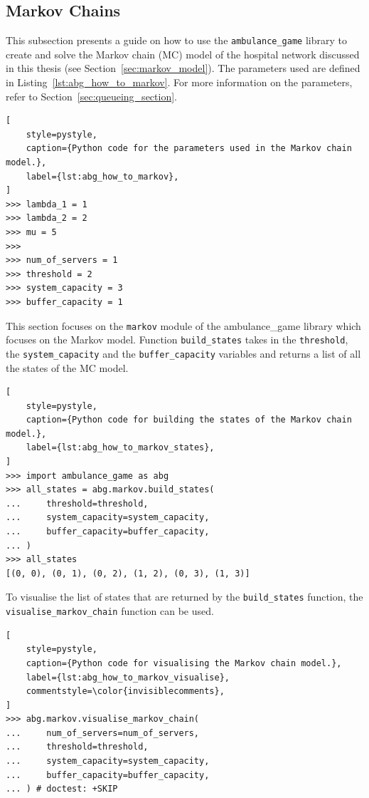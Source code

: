 \subsection{Markov Chains}

This subsection presents a guide on how to use the \texttt{ambulance\_game}
library to create and solve the Markov chain (MC) model of the hospital network
discussed in this thesis (see Section~\ref{sec:markov_model}).
The parameters used are defined in Listing~\ref{lst:abg_how_to_markov}.
For more information on the parameters, refer to
Section~\ref{sec:queueing_section}.


\begin{lstlisting}[
    style=pystyle,
    caption={Python code for the parameters used in the Markov chain model.},
    label={lst:abg_how_to_markov},
]
>>> lambda_1 = 1
>>> lambda_2 = 2
>>> mu = 5
>>>
>>> num_of_servers = 1
>>> threshold = 2
>>> system_capacity = 3
>>> buffer_capacity = 1

\end{lstlisting}

This section focuses on the \texttt{markov} module of the ambulance\_game
library which focuses on the Markov model.
Function \texttt{build\_states} takes in the \texttt{threshold}, the
\texttt{system\_capacity} and the \texttt{buffer\_capacity} variables and
returns a list of all the states of the MC model.

\begin{lstlisting}[
    style=pystyle,
    caption={Python code for building the states of the Markov chain model.},
    label={lst:abg_how_to_markov_states},
]
>>> import ambulance_game as abg
>>> all_states = abg.markov.build_states(
...     threshold=threshold,
...     system_capacity=system_capacity,
...     buffer_capacity=buffer_capacity,
... )
>>> all_states
[(0, 0), (0, 1), (0, 2), (1, 2), (0, 3), (1, 3)]

\end{lstlisting}

To visualise the list of states that are returned by the
\texttt{build\_states} function, the \texttt{visualise\_markov\_chain}
function can be used.

\begin{lstlisting}[
    style=pystyle,
    caption={Python code for visualising the Markov chain model.},
    label={lst:abg_how_to_markov_visualise},
    commentstyle=\color{invisiblecomments},
]
>>> abg.markov.visualise_markov_chain(
...     num_of_servers=num_of_servers,
...     threshold=threshold,
...     system_capacity=system_capacity,
...     buffer_capacity=buffer_capacity,
... ) # doctest: +SKIP
\end{lstlisting}

